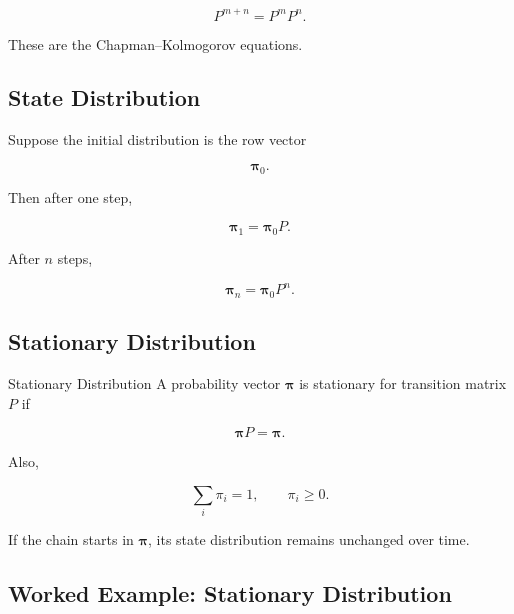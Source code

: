 \[
\boxed{
P^{m+n}
=
P^mP^n.
}
\]

These are the Chapman--Kolmogorov equations.

\subsection{State Distribution}
\label{subsec:markov-state-distribution}

Suppose the initial distribution is the row vector

\[
\boldsymbol{\pi}_0.
\]

Then after one step,

\[
\boxed{
\boldsymbol{\pi}_1
=
\boldsymbol{\pi}_0P.
}
\]

After \(n\) steps,

\[
\boxed{
\boldsymbol{\pi}_n
=
\boldsymbol{\pi}_0P^n.
}
\]

\subsection{Stationary Distribution}
\label{subsec:stationary-distribution-markov}

\begin{definitionbox}{Stationary Distribution}
A probability vector \(\boldsymbol{\pi}\) is stationary for transition
matrix \(P\) if

\[
\boxed{
\boldsymbol{\pi}P
=
\boldsymbol{\pi}.
}
\]

Also,

\[
\boxed{
\sum_i\pi_i=1,
\qquad
\pi_i\geq0.
}
\]
\end{definitionbox}

If the chain starts in \(\boldsymbol{\pi}\), its state distribution
remains unchanged over time.

\subsection{Worked Example: Stationary Distribution}
\label{subsec:worked-stationary-distribution}

